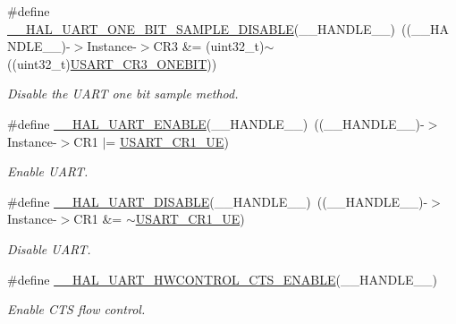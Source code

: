 \begin{DoxyCompactItemize}
\#define \hyperlink{group___u_a_r_t___exported___macros_ga2dbd7e6592e8c5999f817b69f0fd24bb}{\+\_\+\+\_\+\+H\+A\+L\+\_\+\+U\+A\+R\+T\+\_\+\+O\+N\+E\+\_\+\+B\+I\+T\+\_\+\+S\+A\+M\+P\+L\+E\+\_\+\+D\+I\+S\+A\+B\+LE}(\+\_\+\+\_\+\+H\+A\+N\+D\+L\+E\+\_\+\+\_\+)~((\+\_\+\+\_\+\+H\+A\+N\+D\+L\+E\+\_\+\+\_\+)-\/$>$Instance-\/$>$C\+R3 \&= (uint32\+\_\+t)$\sim$((uint32\+\_\+t)\hyperlink{group___peripheral___registers___bits___definition_ga9a96fb1a7beab602cbc8cb0393593826}{U\+S\+A\+R\+T\+\_\+\+C\+R3\+\_\+\+O\+N\+E\+B\+IT}))
\begin{DoxyCompactList}\small\item\em Disable the U\+A\+RT one bit sample method. \end{DoxyCompactList}\item 
\#define \hyperlink{group___u_a_r_t___exported___macros_ga49eb5ea4996a957afeb8be2793ba3fe9}{\+\_\+\+\_\+\+H\+A\+L\+\_\+\+U\+A\+R\+T\+\_\+\+E\+N\+A\+B\+LE}(\+\_\+\+\_\+\+H\+A\+N\+D\+L\+E\+\_\+\+\_\+)~((\+\_\+\+\_\+\+H\+A\+N\+D\+L\+E\+\_\+\+\_\+)-\/$>$Instance-\/$>$C\+R1 $\vert$=  \hyperlink{group___peripheral___registers___bits___definition_ga2bb650676aaae4a5203f372d497d5947}{U\+S\+A\+R\+T\+\_\+\+C\+R1\+\_\+\+UE})
\begin{DoxyCompactList}\small\item\em Enable U\+A\+RT. \end{DoxyCompactList}\item 
\#define \hyperlink{group___u_a_r_t___exported___macros_gad2f9fbdb4adf3a09939e201eaeea072f}{\+\_\+\+\_\+\+H\+A\+L\+\_\+\+U\+A\+R\+T\+\_\+\+D\+I\+S\+A\+B\+LE}(\+\_\+\+\_\+\+H\+A\+N\+D\+L\+E\+\_\+\+\_\+)~((\+\_\+\+\_\+\+H\+A\+N\+D\+L\+E\+\_\+\+\_\+)-\/$>$Instance-\/$>$C\+R1 \&=  $\sim$\hyperlink{group___peripheral___registers___bits___definition_ga2bb650676aaae4a5203f372d497d5947}{U\+S\+A\+R\+T\+\_\+\+C\+R1\+\_\+\+UE})
\begin{DoxyCompactList}\small\item\em Disable U\+A\+RT. \end{DoxyCompactList}\item 
\#define \hyperlink{group___u_a_r_t___exported___macros_ga4a77213945844bca4c22ba6a14b7ee4c}{\+\_\+\+\_\+\+H\+A\+L\+\_\+\+U\+A\+R\+T\+\_\+\+H\+W\+C\+O\+N\+T\+R\+O\+L\+\_\+\+C\+T\+S\+\_\+\+E\+N\+A\+B\+LE}(\+\_\+\+\_\+\+H\+A\+N\+D\+L\+E\+\_\+\+\_\+)
\begin{DoxyCompactList}\small\item\em Enable C\+TS flow control. \end{DoxyCompactList}\item 

\end{DoxyCompactItemize}
